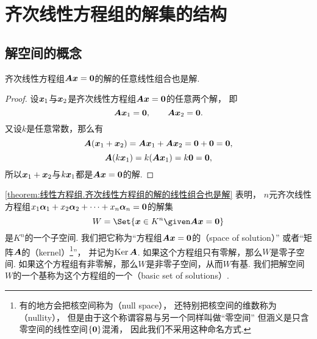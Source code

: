 \section{齐次线性方程组的解集的结构}
\subsection{解空间的概念}
\begin{proposition}\label{theorem:线性方程组.齐次线性方程组的解的线性组合也是解}
齐次线性方程组\(\boldsymbol{A}\boldsymbol{x}=\boldsymbol0\)的解的任意线性组合也是解.
\begin{proof}
设\(\boldsymbol{x}_1\)与\(\boldsymbol{x}_2\)是齐次线性方程组\(\boldsymbol{A}\boldsymbol{x}=\boldsymbol0\)的任意两个解，
即\begin{equation*}
	\boldsymbol{A}\boldsymbol{x}_1=\boldsymbol0, \qquad
	\boldsymbol{A}\boldsymbol{x}_2=\boldsymbol0.
\end{equation*}
又设\(k\)是任意常数，那么有\begin{equation*}
	\boldsymbol{A} (\boldsymbol{x}_1 + \boldsymbol{x}_2) = \boldsymbol{A} \boldsymbol{x}_1 + \boldsymbol{A} \boldsymbol{x}_2 = \boldsymbol0 + \boldsymbol0 = \boldsymbol0,
\end{equation*}\begin{equation*}
	\boldsymbol{A} (k \boldsymbol{x}_1) = k (\boldsymbol{A} \boldsymbol{x}_1) = k \boldsymbol0 = \boldsymbol0,
\end{equation*}
所以\(\boldsymbol{x}_1 + \boldsymbol{x}_2\)与\(k \boldsymbol{x}_1\)都是\(\boldsymbol{A} \boldsymbol{x} = \boldsymbol0\)的解.
\end{proof}
\end{proposition}

\cref{theorem:线性方程组.齐次线性方程组的解的线性组合也是解} 表明，
\(n\)元齐次线性方程组\(x_1\boldsymbol\alpha_1+x_2\boldsymbol\alpha_2+\dotsb+x_n\boldsymbol\alpha_n=\boldsymbol0\)的解集\begin{equation*}
	W = \Set{
		\vb{x} \in K^n
		\given
		\vb{A}\vb{x}=\vb0
	}
\end{equation*}是\(K^n\)的一个子空间.
我们把它称为“方程组\(\boldsymbol{A}\boldsymbol{x}=\boldsymbol0\)的（space of solution）”
或者“矩阵\(\boldsymbol{A}\)的（kernel）\footnote{
	有的地方会把核空间称为（null space），
	还特别把核空间的维数称为（nullity），
	但是由于这个称谓容易与另一个同样叫做“零空间”
	但涵义是只含零空间的线性空间\(\{\boldsymbol0\}\)混淆，
	因此我们不采用这种命名方式.
}”，
并记为\(\operatorname{Ker}\boldsymbol{A}\).
如果这个方程组只有零解，那么\(W\)是零子空间.
如果这个方程组有非零解，那么\(W\)是非零子空间，从而\(W\)有基.
我们把解空间\(W\)的一个基称为这个方程组的一个（basic set of solutions）.

